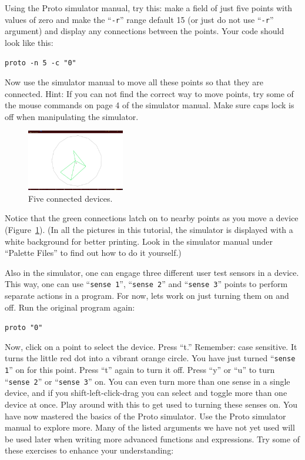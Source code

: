 \documentclass{article}
\newcommand\code[1]{\begin{center}\var{#1}\end{center}}
\newcommand\var[1]{{\tt #1}}
\newcommand\qvar[1]{``{\tt #1}''}
\begin{document}
Using the Proto simulator manual, try this: make a field of just five
points with values of zero and make the \qvar{-r} range default 15 (or
just do not use \qvar{-r} argument) and display any connections
between the points.  Your code should look like this:

\code{proto -n 5 -c "0"}

Now use the simulator manual to move all these points so that they are
connected. Hint: If you can not find the correct way to move points,
try some of the mouse commands on page 4 of the simulator manual.
Make sure caps lock is off when manipulating the simulator.

\begin{figure}
  \includegraphics[width=0.38\textwidth]{figures/five-points.png}
  \caption{Five connected devices.}
  \label{f:fivepoints}
\end{figure}

Notice that the green connections latch on to nearby points as you
move a device (Figure~\ref{f:fivepoints}).  (In all the pictures in
this tutorial, the simulator is displayed with a white background for
better printing.  Look in the simulator manual under ``Palette Files''
to find out how to do it yourself.)

Also in the simulator, one can engage three different user test
sensors in a device. This way, one can use \qvar{sense 1}, \qvar{sense
  2} and \qvar{sense 3} points to perform separate actions in a
program.  For now, lets work on just turning them on and off.  Run the
original program again:

\code{proto "0"}

Now, click on a point to select the device. Press ``t.'' Remember:
case sensitive.  It turns the little red dot into a vibrant orange
circle.  You have just turned \qvar{sense 1} on for this point.  Press
``t'' again to turn it off.  Press ``y'' or ``u'' to turn \qvar{sense
  2} or \qvar{sense 3} on.  You can even turn more than one sense in a
single device, and if you shift-left-click-drag you can select and
toggle more than one device at once.  Play around with this to get used
to turning these senses on.  You have now mastered the basics of the
Proto simulator.  Use the Proto simulator manual to explore more.  Many
of the listed arguments we have not yet used will be used later when
writing more advanced functions and expressions.  Try some of these
exercises to enhance your understanding:
\end{document}
